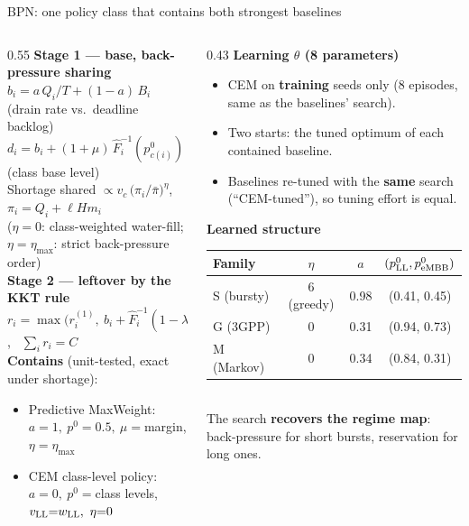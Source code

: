 \documentclass[aspectratio=169,11pt,xcolor=table]{beamer}
\begin{document}
\begin{frame}{BPN: one policy class that contains both strongest baselines}
  \footnotesize
  \begin{columns}[T]
    \begin{column}{0.55\textwidth}
      \textbf{Stage 1 --- base, back-pressure sharing}\\
      $b_i = a\,Q_i/T + (1-a)\,B_i$ \hfill (drain rate vs.\ deadline backlog)\\
      $d_i = b_i + (1+\mu)\,\hat F_i^{-1}(p^0_{c(i)})$ \hfill (class base level)\\
      Shortage shared $\propto v_{c}\,\big(\pi_i/\bar\pi\big)^{\eta}$, \ $\pi_i = Q_i + \ell H m_i$\\
      ($\eta = 0$: class-weighted water-fill; $\eta = \eta_{\max}$: strict back-pressure order)\\[4pt]
      \textbf{Stage 2 --- leftover by the KKT rule}\\
      $r_i = \max\!\big(r_i^{(1)},\ b_i + \hat F_i^{-1}(1 - \lambda/\omega_{c(i)})\big)$, \ $\textstyle\sum_i r_i = C$\\[4pt]
      \textbf{Contains} (unit-tested, exact under shortage):
      \begin{itemize}
        \item Predictive MaxWeight: $a{=}1,\ p^0{=}0.5,\ \mu{=}$margin, $\eta{=}\eta_{\max}$
        \item CEM class-level policy: $a{=}0,\ p^0{=}$class levels, $v_{\rm LL}{=}w_{\rm LL},\ \eta{=}0$
      \end{itemize}
    \end{column}
    \begin{column}{0.43\textwidth}
      \textbf{Learning $\theta$ (8 parameters)}
      \begin{itemize}
        \item CEM on \textbf{training} seeds only (8 episodes, same as the baselines' search).
        \item Two starts: the tuned optimum of each contained baseline.
        \item Baselines re-tuned with the \textbf{same} search (``CEM-tuned''), so tuning effort is equal.
      \end{itemize}
      \textbf{Learned structure}\\[2pt]
      \scriptsize
      \begin{tabular}{lccc}
        \toprule
        Family & $\eta$ & $a$ & $(p^0_{\rm LL}, p^0_{\rm eMBB})$ \\
        \midrule
        S (bursty) & 6 (greedy) & 0.98 & (0.41, 0.45) \\
        G (3GPP) & 0 & 0.31 & (0.94, 0.73) \\
        M (Markov) & 0 & 0.34 & (0.84, 0.31) \\
        \bottomrule
      \end{tabular}\\[2pt]
      \footnotesize The search \textbf{recovers the regime map}: back-pressure for short bursts, reservation for long ones.
    \end{column}
  \end{columns}
\end{frame}
\end{document}
